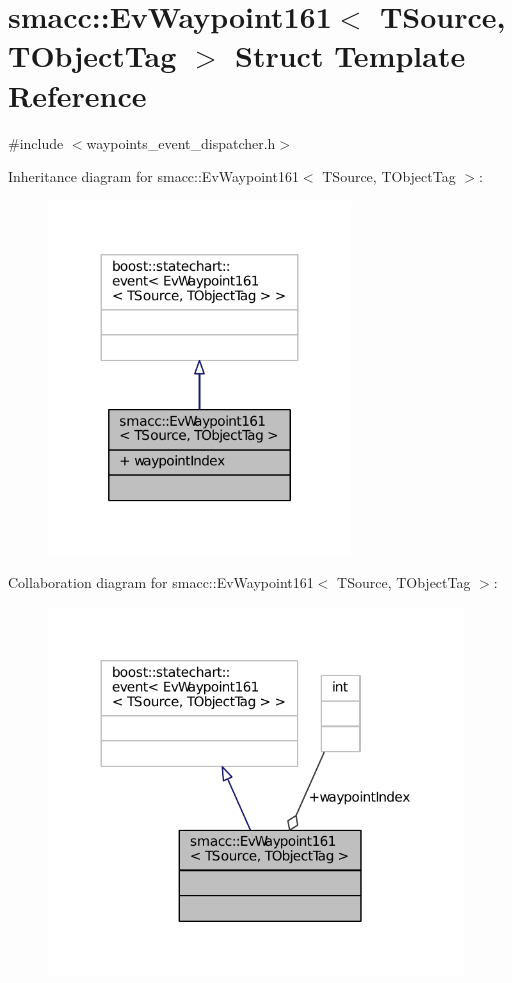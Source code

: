 \hypertarget{structsmacc_1_1EvWaypoint161}{}\section{smacc\+:\+:Ev\+Waypoint161$<$ T\+Source, T\+Object\+Tag $>$ Struct Template Reference}
\label{structsmacc_1_1EvWaypoint161}


{\ttfamily \#include $<$waypoints\+\_\+event\+\_\+dispatcher.\+h$>$}



Inheritance diagram for smacc\+:\+:Ev\+Waypoint161$<$ T\+Source, T\+Object\+Tag $>$\+:
\nopagebreak
\begin{figure}[H]
\begin{center}
\leavevmode
\includegraphics[width=227pt]{structsmacc_1_1EvWaypoint161__inherit__graph}
\end{center}
\end{figure}


Collaboration diagram for smacc\+:\+:Ev\+Waypoint161$<$ T\+Source, T\+Object\+Tag $>$\+:
\nopagebreak
\begin{figure}[H]
\begin{center}
\leavevmode
\includegraphics[width=312pt]{structsmacc_1_1EvWaypoint161__coll__graph}
\end{center}
\end{figure}
